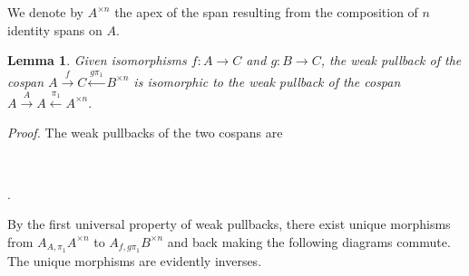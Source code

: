 \documentclass[12pt,twoside,openright]{report}
\newtheorem{lemma}{Lemma}
\newcommand{\maps}{\colon}
\begin{document}
We denote by $A^{\times n}$ the apex of the span resulting from the composition of $n$ identity spans on $A.$

\begin{lemma}
  \label{piling}
  Given isomorphisms $f\maps A \to C$ and $g\maps B \to C$, the weak pullback of the cospan $A \stackrel{f}{\to} C \stackrel{g\pi_1}{\leftarrow} B^{\times n}$ is isomorphic to the weak pullback of the cospan $A \stackrel{A}{\to} A \stackrel{\pi_1}{\leftarrow} A^{\times n}.$
\end{lemma}
{\em Proof.}  
The weak pullbacks of the two cospans are
\begin{center}
  $\quad \quad$
  .
\end{center}
By the first universal property of weak pullbacks, there exist unique morphisms from $A_{A,\pi_1}A^{\times n}$ to $A_{f,g\pi_1}B^{\times n}$ and back making the following diagrams commute.  The unique morphisms are evidently inverses.
\end{document}
